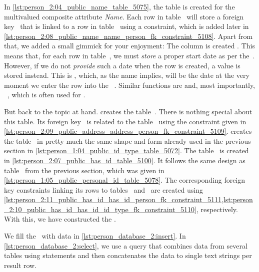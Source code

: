 In \cref{lst:person_2:04_public_name_table_5075}, the table  is created for the multivalued composite attribute \emph{Name}.
Each row in table~ will store a foreign key~ that is linked to a row in table~ using a  constraint, which is added later in \cref{lst:person_2:08_public_name_name_person_fk_constraint_5108}.
Apart from that, we added a small gimmick for your enjoyment:
The column  is created .
This means that, for each row in table~, we must \emph{store} a proper start date as per the~.
However, if we do not \emph{provide} such a date when the row is created, a  value is stored instead.
This  is , which, as the name implies, will be the date at the very moment we enter the row into the \db~\cite{PGDG:PD:DTFAO}.
Similar functions are  and, most importantly, ~\cite{PGDG:PD:DTFAO}, which is often used for .

But back to the topic at hand.
 creates the table~.
There is nothing special about this table.
Its foreign key~ is related to the table~ using the  constraint given in \cref{lst:person_2:09_public_address_address_person_fk_constraint_5109}.
 creates the table~ in pretty much the same shape and form already used in the previous section in \cref{lst:person_1:04_public_id_type_table_5072}.
The table~ is created in \cref{lst:person_2:07_public_has_id_table_5100}.
It follows the same design as table~ from the previous section, which was given in \cref{lst:person_1:05_public_personal_id_table_5078}.
The corresponding foreign key constraints linking its rows to tables~ and~ are created using \cref{lst:person_2:11_public_has_id_has_id_person_fk_constraint_5111,lst:person_2:10_public_has_id_has_id_id_type_fk_constraint_5110}, respectively.
With this, we have constructed the .

We fill the \db\ with data in \cref{lst:person_database_2:insert}.
In \cref{lst:person_database_2:select}, we use a query that combines data from several tables using  statements and then concatenates the data to single text strings per result row.%
%
\FloatBarrier%
\endhsection%
%
